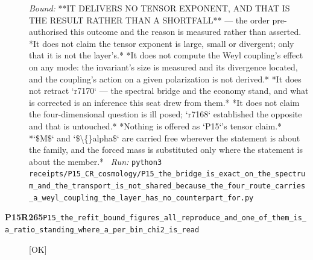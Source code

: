\begin{description}
 \emph{Bound:}  **IT DELIVERS NO TENSOR EXPONENT, AND THAT IS THE RESULT RATHER THAN A SHORTFALL** --- the order pre-authorised this outcome and the reason is measured rather than asserted.  *It does not claim the tensor exponent is large, small or divergent; only that it is not the layer's.*  *It does not compute the Weyl coupling's effect on any mode: the invariant's size is measured and its divergence located, and the coupling's action on a given polarization is not derived.*  *It does not retract `r7170` --- the spectral bridge and the economy stand, and what is corrected is an inference this seat drew from them.*  *It does not claim the four-dimensional question is ill posed; `r7168` established the opposite and that is untouched.*  *Nothing is offered as `P15`'s tensor claim.*  *`\$M\$` and `\$\textbackslash\{\}alpha\$` are carried free wherever the statement is about the family, and the forced mass is substituted only where the statement is about the member.*
\ \emph{Run:} \texttt{python3 receipts/P15\_CR\_cosmology/P15\_the\_bridge\_is\_exact\_on\_the\_spectrum\_and\_the\_transport\_is\_not\_shared\_because\_the\_four\_route\_carries\_a\_weyl\_coupling\_the\_layer\_has\_no\_counterpart\_for.py}
\item[\rcptlabel{P15_the_refit_bound_figures_all_reproduce_and_one_of_them_is_a_ratio_standing_where_a_per_bin_chi2_is_read}{P15R265}\textbf{P15R265}\quad\texttt{P15\_the\_refit\_bound\_figures\_all\_reproduce\_and\_one\_of\_them\_is\_a\_ratio\_standing\_where\_a\_per\_bin\_chi2\_is\_read}]\hfill\textsf{[OK]}\\

\end{description}

